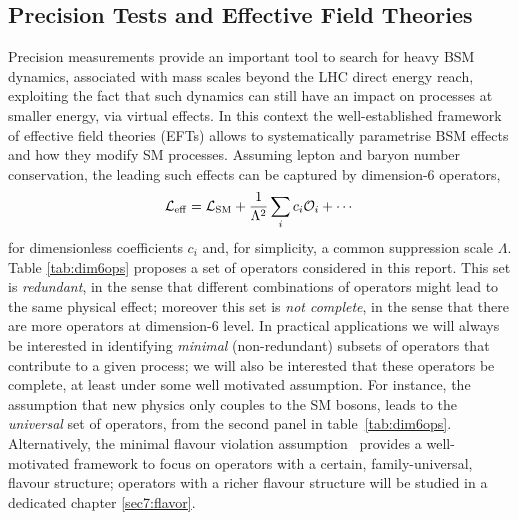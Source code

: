 \subsection{Precision Tests and Effective Field Theories}\label{sec:eftintro}
Precision measurements provide an important tool to search for heavy BSM dynamics, associated with mass scales beyond the LHC direct energy reach,  exploiting the fact that such dynamics can still have an impact on processes at smaller energy, via virtual effects.
%
In this context the well-established framework of effective field theories (EFTs) allows to systematically parametrise BSM effects and how they modify SM processes. Assuming lepton and baryon number conservation, the leading such effects can be captured by dimension-6 operators,
\begin{equation}\label{EFTLAG}
\mathcal{L}_{\rm eff} = \mathcal{L}_{\rm SM} + \frac{1}{\Lambda^2} \sum_{i} c_i \mathcal{O}_i+\cdots
\end{equation}
for dimensionless coefficients $c_i$ and, for simplicity, a common suppression scale $\Lambda$. Table \ref{tab:dim6ops} proposes a  set of operators considered in this report. This set is \emph{redundant}, in the sense that different combinations of operators might lead to the same physical effect; moreover this set is \emph{not complete}, in the sense that there are more  operators at dimension-6 level.
In practical applications we will always be interested in identifying \emph{minimal} (non-redundant) subsets of operators that contribute to a given process; we will also be interested that these operators be complete, at least under some well motivated assumption. For instance, the assumption that new physics only couples to the SM bosons, leads to the \emph{universal} set of operators, from the second panel in table~\ref{tab:dim6ops}. Alternatively, the minimal flavour violation assumption~\cite{DAmbrosio:2002vsn} provides a well-motivated framework to focus on operators with a certain, family-universal, flavour structure; operators with a richer flavour structure will be studied in a dedicated chapter \ref{sec7:flavor}.



